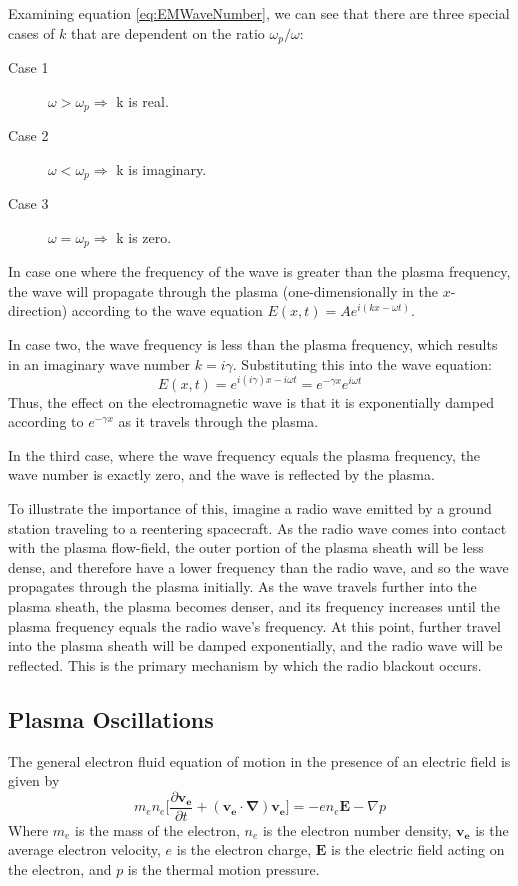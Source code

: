 \documentclass[twocolumn]{article}
\begin{document}
Examining equation \ref{eq:EMWaveNumber}, we can see that there are three special cases of $k$ that are dependent on the ratio $\omega_p/\omega$:
\begin{description}
	\item [Case 1]$\omega > \omega_p \Rightarrow$ k is real.
	\item [Case 2]$\omega < \omega_p \Rightarrow$ k is imaginary.
	\item [Case 3]$\omega = \omega_p \Rightarrow$ k is zero.
\end{description}

In case one where the frequency of the wave is greater than the plasma frequency, the wave will propagate through the plasma (one-dimensionally in the $x$-direction) according to the wave equation $E(x,t) = Ae^{i(kx - \omega t)}$.

In case two, the wave frequency is less than the plasma frequency, which results in an imaginary wave number $k = i\gamma$.
Substituting this into the wave equation:
\begin{equation}
	E(x,t) = e^{i(i\gamma)x - i\omega t} = e^{-\gamma x}e^{i\omega t}
\end{equation}
Thus, the effect on the electromagnetic wave is that it is exponentially damped according to $e^{-\gamma x}$ as it travels through the plasma.

In the third case, where the wave frequency equals the plasma frequency, the wave number is exactly zero, and the wave is reflected by the plasma.

To illustrate the importance of this, imagine a radio wave emitted by a ground station traveling to a reentering spacecraft.
As the radio wave comes into contact with the plasma flow-field, the outer portion of the plasma sheath will be less dense, and therefore have a lower frequency than the radio wave, and so the wave propagates through the plasma initially.
As the wave travels further into the plasma sheath, the plasma becomes denser, and its frequency increases until the plasma frequency equals the radio wave's frequency.
At this point, further travel into the plasma sheath will be damped exponentially, and the radio wave will be reflected.
This is the primary mechanism by which the radio blackout occurs.
\subsection*{Plasma Oscillations}
The general electron fluid equation of motion in the presence of an electric field is given by
\begin{equation} \label{eq:emotionhot}
m_en_e \lbrack \frac{\partial \mathbf{v_e}}{\partial t} + \left( \mathbf{v_e} \cdot \mathbf{\nabla} \right) \mathbf{v_e} \rbrack = -en_e\mathbf{E} - \nabla p
\end{equation}
Where $m_e$ is the mass of the electron, $n_e$ is the electron number density, $\mathbf{v_e}$ is the average electron velocity, $e$ is the electron charge, $\mathbf{E}$ is the electric field acting on the electron, and $p$ is the thermal motion pressure.
\end{document}
